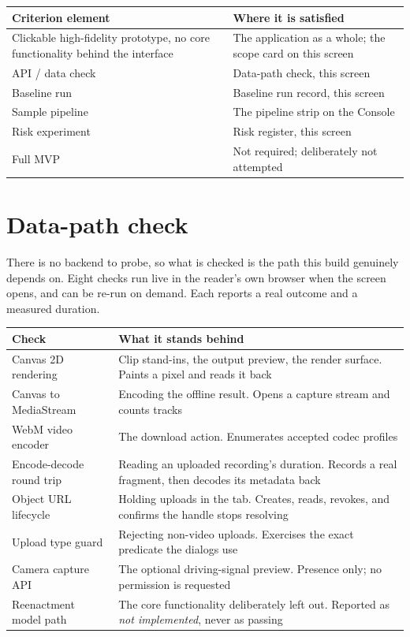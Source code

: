 \documentclass[11pt,a4paper]{report}
\begin{document}
\begin{longtable}{L{6.6cm} L{8.2cm}}
\toprule
\textbf{Criterion element} & \textbf{Where it is satisfied} \\
\midrule
\endhead
Clickable high-fidelity prototype, no core functionality behind the interface
  & The application as a whole; the scope card on this screen \\
API / data check & Data-path check, this screen \\
Baseline run & Baseline run record, this screen \\
Sample pipeline & The pipeline strip on the Console \\
Risk experiment & Risk register, this screen \\
Full MVP & Not required; deliberately not attempted \\
\bottomrule
\end{longtable}

\section{Data-path check}

There is no backend to probe, so what is checked is the path this build
genuinely depends on. Eight checks run live in the reader's own browser when
the screen opens, and can be re-run on demand. Each reports a real outcome and
a measured duration.

\begin{longtable}{L{4.4cm} L{10.4cm}}
\toprule
\textbf{Check} & \textbf{What it stands behind} \\
\midrule
\endhead
Canvas 2D rendering & Clip stand-ins, the output preview, the render surface.
  Paints a pixel and reads it back \\
Canvas to MediaStream & Encoding the offline result. Opens a capture stream
  and counts tracks \\
WebM video encoder & The download action. Enumerates accepted codec profiles \\
Encode-decode round trip & Reading an uploaded recording's duration. Records a
  real fragment, then decodes its metadata back \\
Object URL lifecycle & Holding uploads in the tab. Creates, reads, revokes,
  and confirms the handle stops resolving \\
Upload type guard & Rejecting non-video uploads. Exercises the exact predicate
  the dialogs use \\
Camera capture API & The optional driving-signal preview. Presence only; no
  permission is requested \\
Reenactment model path & The core functionality deliberately left out.
  Reported as \emph{not implemented}, never as passing \\
\bottomrule
\end{longtable}
\end{document}
